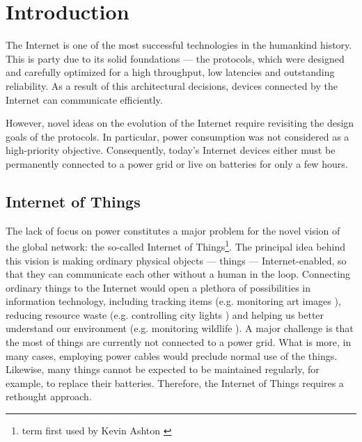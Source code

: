 \chapter{Introduction}

The Internet is one of the most successful technologies in the humankind history.
This is party due to its solid foundations --- the protocols, which were designed and carefully optimized for a high throughput, low latencies and outstanding reliability.
As a result of this architectural decisions, devices connected by the Internet can communicate efficiently.

However, novel ideas on the evolution of the Internet require revisiting the design goals of the protocols.
In particular, power consumption was not considered as a high-priority objective.
Consequently, today's Internet devices either must be permanently connected to a power grid or live on batteries for only a few hours.

\section{Internet of Things}

The lack of focus on power constitutes a major problem for the novel vision of the global network: the so-called Internet of Things\footnote{term first used by Kevin Ashton \cite{InternetOfThings}}.
The principal idea behind this vision is making ordinary physical objects --- things --- Internet-enabled, so that they can communicate each other without a human in the loop.
Connecting ordinary things to the Internet would open a plethora of possibilities in information technology, including tracking items (e.g. monitoring art images \cite{GuArtNet}), reducing resource waste (e.g. controlling city lights \cite{singhvi2005intelligent}) and helping us better understand our environment (e.g. monitoring wildlife \cite{liu2009long}).
A major challenge is that the most of things are currently not connected to a power grid.
What is more, in many cases, employing power cables would preclude normal use of the things.
Likewise, many things cannot be expected to be maintained regularly, for example, to replace their batteries.
Therefore, the Internet of Things requires a rethought approach.


